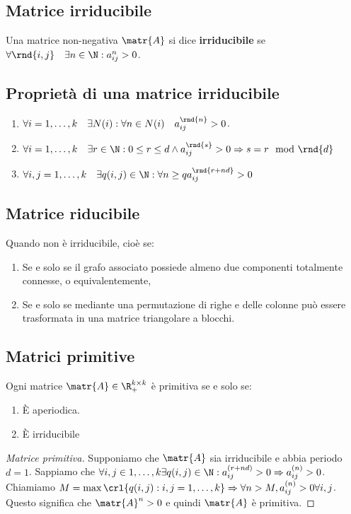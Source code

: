 \documentclass[\main/main.tex]{subfiles}
\begin{document}
\subsection{Matrice irriducibile}
Una matrice non-negativa \(\matr{A}\) si dice \textbf{irriducibile} se \(\forall \rnd{i,j} \quad \exists n \in \N: a_{ij}^n > 0\).

\subsection{Proprietà di una matrice irriducibile}
\begin{enumerate}
  \item \(\forall i = 1, \ldots, k \quad \exists N(i): \forall n \in N(i) \quad a_{ij}^{\rnd{n}} > 0\).
  \item \(\forall i = 1, \ldots, k \quad \exists r \in \N: 0 \leq r \leq d \land a_{ij}^{\rnd{s}}>0 \Rightarrow s = r\mod\rnd{d}\)
  \item \(\forall i,j = 1, \ldots, k \quad \exists q(i,j) \in \N: \forall n \geq q a_{ij}^{\rnd{r+nd}}>0\)
\end{enumerate}

\subsection{Matrice riducibile}
Quando non è irriducibile, cioè se:
\begin{enumerate}
  \item Se e solo se il grafo associato possiede almeno due componenti totalmente connesse, o equivalentemente,
  \item Se e solo se mediante una permutazione di righe e delle colonne può essere trasformata in una matrice triangolare a blocchi.
\end{enumerate}

\subsection{Matrici primitive}
\begin{definition}
  Ogni matrice \(\matr{A} \in \R^{k\times k}_{+}\) è primitiva se e solo se:
  \begin{enumerate}
    \item È aperiodica.
    \item È irriducibile
  \end{enumerate}
\end{definition}

\begin{proof}[Matrice primitiva]
  Supponiamo che \(\matr{A}\) sia irriducibile e abbia periodo \(d=1\). Sappiamo che \(\forall i,j \in 1, \ldots, k \exists q(i,j) \in \N: a_{ij}^{(r+nd)} >0 \Rightarrow a_{ij}^{(n)} > 0\).
  Chiamiamo \(M = \max\crl{q(i,j): i,j = 1, \ldots, k} \Rightarrow \forall n > M, a_{ij}^{(n)} > 0 \forall i,j\). Questo significa che \(\matr{A}^n>0\) e quindi \(\matr{A}\) è primitiva.
\end{proof}
\end{document}
